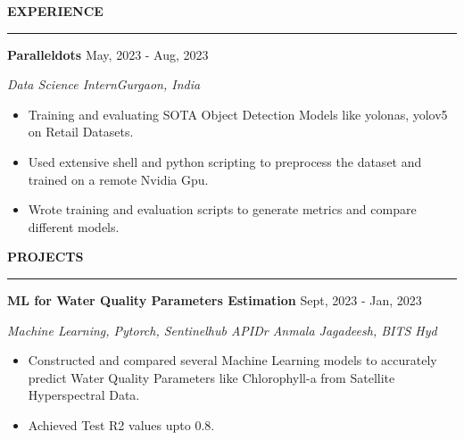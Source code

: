 \documentclass[a4paper,12pt]{report}
\newcommand{\marginAdj}{0.5in}
\begin{document}
 \par
 \vspace{9pt}
 
\noindent 
\textbf{EXPERIENCE} \par
\vspace{2pt}
\hrule
\vspace{6pt}


\noindent 
\textbf{Paralleldots}{\fontsize{9pt}{9pt}\selectfont \hspace*{4.30in} \hspace*{\marginAdj} {\fontsize{12pt}{12pt}\selectfont May, 2023 - Aug, 2023}} \par
\noindent 
{\fontsize{12pt}{12pt}\selectfont \textit{Data Science Intern}\hfill\textit{Gurgaon, India}} \par
\noindent 
\begin{itemize}[noitemsep,topsep=0pt]
    \item {\fontsize{12pt}{12pt}\selectfont Training and evaluating SOTA Object Detection Models like yolonas, yolov5 on Retail Datasets.} \par
    \noindent
    \item {\fontsize{12pt}{12pt}\selectfont Used extensive shell and python scripting to preprocess the dataset and trained on a remote Nvidia Gpu.} \par
    \noindent 
    \item {\fontsize{12pt}{12pt}\selectfont Wrote training and evaluation scripts to generate metrics and compare different models. } \par
    \noindent
\end{itemize}



 \par
\vspace{9pt}



\noindent 
\textbf{PROJECTS} \par
\vspace{2pt}
\hrule
\vspace{6pt}

\noindent
\textbf{ML for Water Quality Parameters Estimation} \hspace*{\marginAdj} \hspace*{1.90in} {\fontsize{12pt}{12pt}\selectfont Sept, 2023 - Jan, 2023} \par
\par
\noindent 
{\fontsize{12pt}{12pt}\selectfont \textit{Machine Learning, Pytorch, Sentinelhub API}\hfill\textit{Dr Anmala Jagadeesh, BITS Hyd}} \par
\noindent 
\begin{itemize}[noitemsep,topsep=0pt]
    \item {\fontsize{12pt}{12pt}\selectfont Constructed and compared several Machine Learning models to accurately predict Water Quality Parameters like Chlorophyll-a from Satellite Hyperspectral Data.} \par
    \item {\fontsize{12pt}{12pt}\selectfont Achieved Test R2 values upto 0.8.} \par
\end{itemize}
\end{document}
